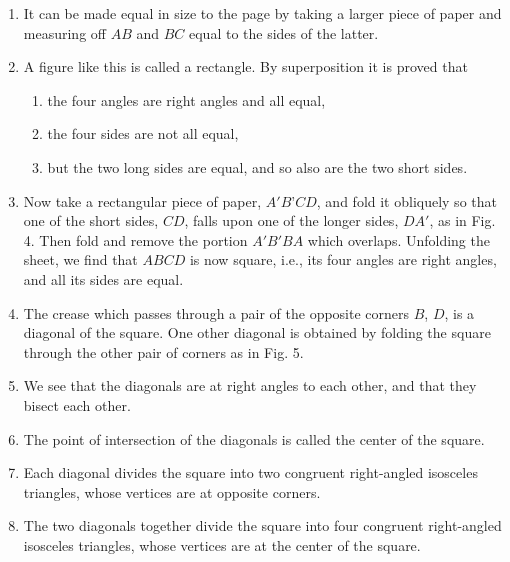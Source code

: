 \begin{enumerate}
    \item It can be made equal in size to the page by taking a larger piece of
        paper and measuring off $AB$ and $BC$ equal to the sides of the latter.
    
    \item A figure like this is called a rectangle.  By superposition it is
        proved that 

        \begin{enumerate}[(1)]
            \item the four angles are right angles and all equal, 
            \item the four sides are not all equal, 
            \item but the two long sides are equal, and so also are the two
                short sides.
        \end{enumerate}

    \item Now take a rectangular piece of paper, $A'B’CD$, and fold it obliquely
        so that one of the short sides, $CD$, falls upon one of the longer
        sides, $DA'$, as in Fig. 4.  Then fold and remove the portion $A'B'BA$
        which overlaps. Unfolding the sheet, we find that $ABCD$ is now square,
        i.e., its four angles are right angles, and all its sides are equal.
    
    
    \item The crease which passes through a pair of the opposite corners $B$,
        $D$, is a diagonal of the square.  One other diagonal is obtained by
        folding the square through the other pair of corners as in Fig. 5.
    
    \item We see that the diagonals are at right angles to each other, and that
        they bisect each other.
    
    \item The point of intersection of the diagonals is called the center of the
        square.
    
    \item Each diagonal divides the square into two congruent right-angled
        isosceles triangles, whose vertices are at opposite corners.
    
    \item The two diagonals together divide the square into four congruent
        right-angled isosceles triangles, whose vertices are at the center of
        the square.
    

\end{enumerate}
